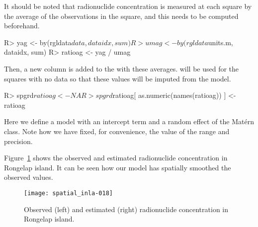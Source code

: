 \documentclass[article]{jss}
\begin{document}
It should be noted that  radionuclide concentration is measured at each square
by the average of the observations in the square, and this needs
to be computed beforehand.


\begin{Schunk}
\begin{Sinput}
R> yag <- by(rgldata$data, dataidx, sum)
R> umag <- by(rgldata$units.m, dataidx, sum)
R> ratioag <- yag / umag
\end{Sinput}
\end{Schunk}

Then, a new column is added to the  with these
averages. will be used for
the squares with no data so that these values will be imputed from the model.
\begin{Schunk}
\begin{Sinput}
R> spgrd$ratioag <- NA
R> spgrd$ratioag[ as.numeric(names(ratioag)) ] <- ratioag
\end{Sinput}
\end{Schunk}

Here we define a model with an intercept term and a random effect of the
Mat\'ern class. Note how we have fixed, for convenience, 
the value of the range and precision.

\begin{Schunk}
\end{Schunk}

Figure~\ref{fig:geos} shows the observed and estimated radionuclide
concentration in Rongelap island. It can be seen how our model has spatially
smoothed the observed values.

\begin{figure}[h]
\begin{center}
\texttt{[image: spatial\_inla-018]}
\caption{Observed (left) and estimated (right) radionuclide concentration
in Rongelap island.}
\label{fig:geos}
\end{center}
\end{figure}
\end{document}
